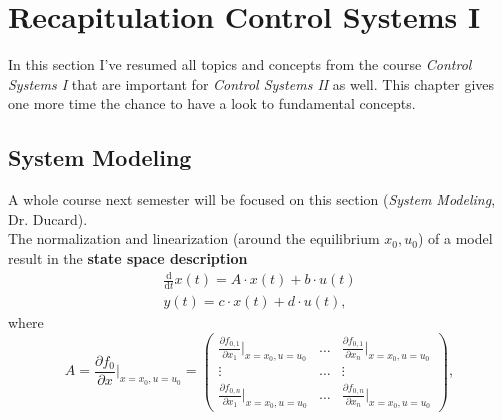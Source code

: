 \documentclass[a4paper,12 pt]{article}
\numberwithin{equation}{section}
\theoremstyle{definition}
\theoremstyle{remark}
\theoremstyle{definition}
\theoremstyle{definition}
\theoremstyle{definition}
\theoremstyle{remark}
\newcommand{\dd}[2]{\frac{\text{d}#1}{\text{d}#2}}
\begin{document}
\setcounter{secnumdepth}{4}

\newpage



\setcounter{section}{0}
\setcounter{subsection}{0}
\section{Recapitulation Control Systems I}
In this section I've resumed all topics and concepts from the course  \textit{Control Systems I} that are important for \textit{Control Systems II} as well. This chapter gives one more time the chance to have a look to fundamental concepts.
\subsection{System Modeling}
A whole course next semester will be focused on this section (\textit{System Modeling}, Dr. Ducard).\\ The normalization and linearization (around the equilibrium $x_0,u_0$) of a model result in the \textbf{state space description}
 \begin{equation}
 \begin{split}
 \dd{}{t} x(t) = A \cdot x(t) + b \cdot u(t) \\
 y(t) = c \cdot x(t) + d \cdot u(t),
 \end{split}
 \label{eqstatespace}
 \end{equation}
 where
\begin{equation*}
A = \frac{\partial f_0}{\partial x}\Big\vert_{x=x_0,u=u_0} = \begin{pmatrix}\frac{\partial f_{0,1}}{\partial x_1}\Big\vert_{x=x_0,u=u_0} & \dots & \frac{\partial f_{0,1}}{\partial x_n}|_{x=x_0,u=u_0} \\ \vdots & \dots & \vdots \\ \frac{\partial f_{0,n}}{\partial x_1}\Big\vert_{x=x_0,u=u_0}& \dots & \frac{\partial f_{0,n}}{\partial x_n}\Big\vert_{x=x_0,u=u_0} \end{pmatrix},
 \end{equation*}
\end{document}
